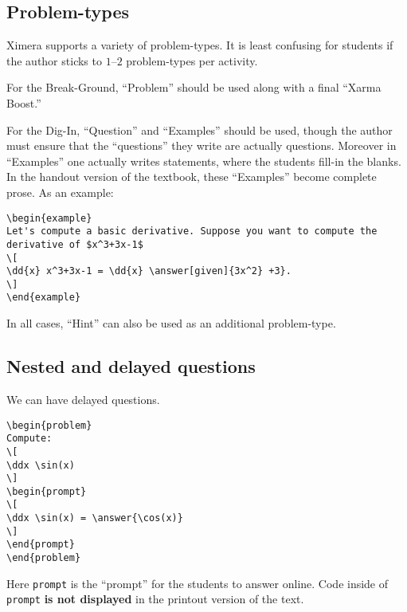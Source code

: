 \documentclass{ximera}
\begin{document}
\subsection*{Problem-types}

Ximera supports a variety of problem-types. It is least confusing for
students if the author sticks to $1$--$2$ problem-types per activity.



For the Break-Ground, ``Problem'' should be used along with a final ``Xarma
Boost.''



For the Dig-In, ``Question'' and ``Examples'' should be used, though
the author must ensure that the ``questions'' they write are actually
questions. Moreover in ``Examples'' one actually writes statements,
where the students fill-in the blanks. In the handout version of the
textbook, these ``Examples'' become complete prose. As an example:

\begin{verbatim}
\begin{example}
Let's compute a basic derivative. Suppose you want to compute the
derivative of $x^3+3x-1$
\[
\dd{x} x^3+3x-1 = \dd{x} \answer[given]{3x^2} +3}.
\]
\end{example}
\end{verbatim}

In all cases, ``Hint'' can also be used as an additional problem-type.

\subsection*{Nested and delayed questions}


We can have delayed questions.

\begin{verbatim}
\begin{problem}
Compute:
\[
\ddx \sin(x)
\]
\begin{prompt}
\[
\ddx \sin(x) = \answer{\cos(x)}
\]
\end{prompt}
\end{problem}
\end{verbatim}

Here \texttt{prompt} is the ``prompt'' for the students to answer online. Code inside of \texttt{prompt} \textbf{is not displayed} in the printout version of the text. 
\end{document}
